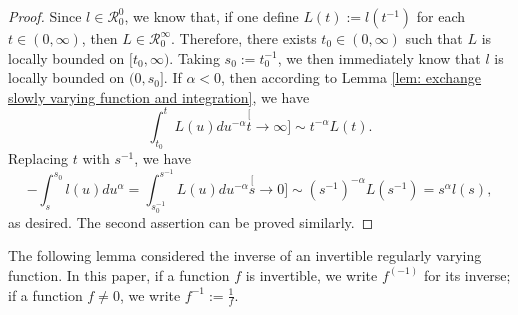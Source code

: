 \documentclass[12pt, a4paper]{amsart}
\theoremstyle{definition}
\numberwithin{equation}{section}
\begin{document}
\begin{proof}
	Since $l \in \mathcal R^0_0$, we know that, if one define $L(t):=l(t^{-1})$ for each $t\in (0,\infty)$, then $ L \in \mathcal R^\infty_0$.  
	Therefore, there exists $t_0\in (0,\infty)$ such that $L$ is locally bounded on $[t_0,\infty)$.
	Taking $s_0:= t_0^{-1}$, we then immediately know that $l$ is locally bounded on $(0,s_0]$.
	If $\alpha<0 $, then according to Lemma \ref{lem: exchange slowly varying function and integration}, we have
\[
	\int_{t_0}^t L(u)du^{-\alpha} 
	\stackrel[t\to \infty]{}{\sim} t^{-\alpha}  L(t).
\]  
	Replacing $t$ with $s^{-1}$, we have
\[
	-\int_{s}^{s_0} l(u)du^{\alpha} 
	=\int_{s_0^{-1}}^{s^{-1}} L(u)du^{-\alpha}
	\stackrel[s\to 0]{}{\sim}  (s^{-1})^{-\alpha}L(s^{-1})
	=s^\alpha l(s),
\]
	as desired.
	The second assertion can be proved similarly.
\end{proof}

	The following lemma considered the inverse of an invertible regularly varying function. 
	In this paper, if a function $f$ is invertible, we write $f^{(-1)}$ for its inverse; if a function $f\neq 0$, we write $f^{-1} := \frac{1}{f} $.
\end{document}
